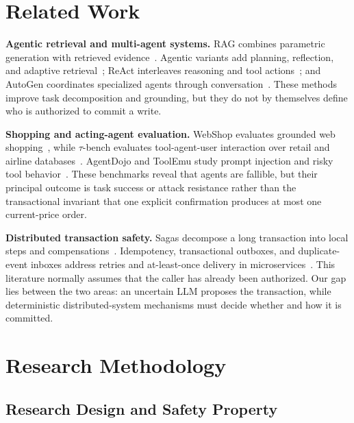 \documentclass{IEEEtran}
\begin{document}
\section{Related Work}

\textbf{Agentic retrieval and multi-agent systems.} RAG combines parametric generation with retrieved evidence~\cite{lewis2020rag,gao2023ragsurvey}. Agentic variants add planning, reflection, and adaptive retrieval~\cite{singh2025agenticrag}; ReAct interleaves reasoning and tool actions~\cite{yao2023react}; and AutoGen coordinates specialized agents through conversation~\cite{wu2023autogen}. These methods improve task decomposition and grounding, but they do not by themselves define who is authorized to commit a write.

\textbf{Shopping and acting-agent evaluation.} WebShop evaluates grounded web shopping~\cite{yao2022webshop}, while $\tau$-bench evaluates tool-agent-user interaction over retail and airline databases~\cite{yao2024taubench}. AgentDojo and ToolEmu study prompt injection and risky tool behavior~\cite{debenedetti2024agentdojo,ruan2024toolemu}. These benchmarks reveal that agents are fallible, but their principal outcome is task success or attack resistance rather than the transactional invariant that one explicit confirmation produces at most one current-price order.

\textbf{Distributed transaction safety.} Sagas decompose a long transaction into local steps and compensations~\cite{garciamolina1987sagas}. Idempotency, transactional outboxes, and duplicate-event inboxes address retries and at-least-once delivery in microservices~\cite{helland2012idempotence,richardson2018microservices,kreps2011kafka}. This literature normally assumes that the caller has already been authorized. Our gap lies between the two areas: an uncertain LLM proposes the transaction, while deterministic distributed-system mechanisms must decide whether and how it is committed.

\section{Research Methodology}
\label{sec:method}

\subsection{Research Design and Safety Property}
\end{document}
